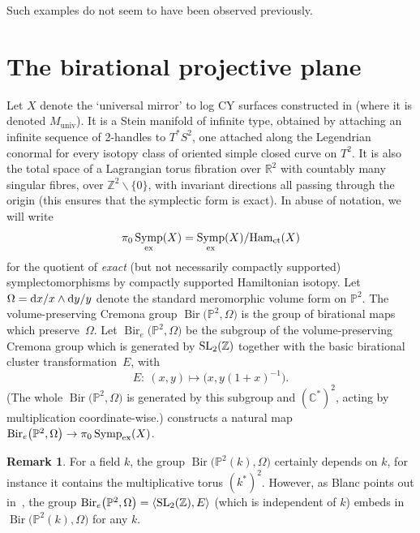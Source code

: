 \documentclass[pdftex]{sigma}
\DeclareMathOperator{\Bir}{Bir}
\newcommand{\Ham}{\mathrm{Ham}}
\DeclareMathOperator{\Symp}{Symp}
\def\bP{\mathbb{P}}
\def\bZ{\mathbb{Z}}
\def\bC{\mathbb{C}}
\def\bR{\mathbb{R}}
\theoremstyle{definition}
\newtheorem{rmk}[thm]{Remark}
\numberwithin{equation}{section}
\begin{document}
Such examples do not seem to have been observed previously.

\section{The birational projective plane}\label{sec:birational-proj-plane}


 Let $X$ denote the `universal mirror' to log CY surfaces constructed in \cite[Section 2.5]{Keating-Ward} (where it is denoted $M_\mathrm{univ}$). It is a Stein manifold of infinite type, obtained by attaching an infinite sequence of 2-handles to $T^*S^2$, one attached along the Legendrian conormal for every isotopy class of oriented simple closed curve on $T^2$. It is also the total space of a Lagrangian torus fibration over $\bR^2$ with countably many singular fibres, over $\bZ^2\backslash\{0\}$, with invariant directions all passing through the origin (this ensures that the symplectic form is exact). In abuse of notation, we will write
 \[
 \pi_0\Symp_{\rm ex}(X) = \Symp_{\rm ex}(X)/\Ham_{\rm ct}(X)
 \]
 for the quotient of \emph{exact} (but not necessarily compactly supported) symplectomorphisms by compactly supported Hamiltonian isotopy. Let $\Omega = {\rm d}x/x \wedge {\rm d}y/y$ denote the standard meromorphic volume form on $\bP^2$. The volume-preserving Cremona group $\Bir\bigl(\bP^2,\Omega\bigr)$ is the group of birational maps which preserve~$\Omega$. Let $\Bir_e\bigl(\bP^2,\Omega\bigr)$ be the subgroup of the volume-preserving Cremona group which is generated by ${\rm SL}_2(\bZ)$ together with the basic birational cluster transformation~$E$, with
 \[
 E\colon \ (x,y) \mapsto \bigl(x,y(1+x)^{-1}\bigr).
 \]
 (The whole $\Bir\bigl(\bP^2,\Omega\bigr)$ is generated by this subgroup and $(\bC^\ast)^2$, acting by multiplication coor\-dinate-wise.)
\cite[Section~3.2]{Keating-Ward} constructs a natural map $\Bir_e\bigl(\bP^2,\Omega\bigr) \to \pi_0\Symp_{\rm ex}(X)$.

\begin{rmk}
 For a field $k$, the group $\Bir\bigl(\bP^2(k),\Omega\bigr)$ certainly depends on $k$, for instance it contains the multiplicative torus $(k^*)^2$. However, as Blanc points out in~\cite{Blanc}, the group $\Bir_e\bigl(\bP^2,\Omega\bigr) = \langle {\rm SL}_2(\bZ), E\rangle$ (which is independent of $k$) embeds in $\Bir\bigl(\bP^2(k),\Omega\bigr)$ for any $k$.
\end{rmk}
\end{document}
